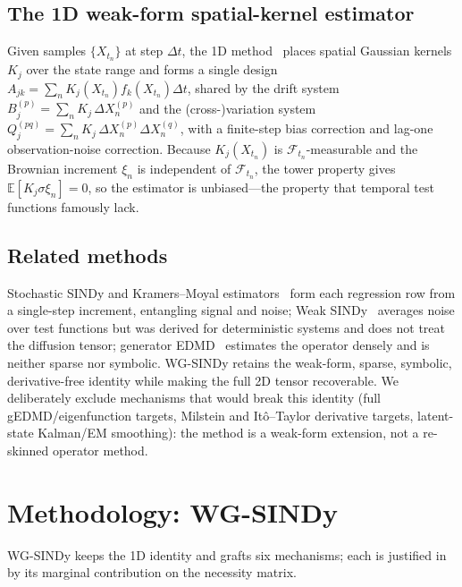 \documentclass[11pt]{article}
\newcommand{\E}{\mathbb{E}}
\newcommand{\Kj}{K_j}
\begin{document}
\subsection{The 1D weak-form spatial-kernel estimator}

Given samples $\{X_{t_n}\}$ at step $\Delta t$, the 1D method~\citep{eshwar2026weak} places
spatial Gaussian kernels $\Kj$ over the state range and forms a single design
$A_{jk}=\sum_n \Kj(X_{t_n})f_k(X_{t_n})\Delta t$, shared by the drift system
$B^{(p)}_j=\sum_n \Kj\,\Delta X_n^{(p)}$ and the (cross-)variation system
$Q^{(pq)}_j=\sum_n \Kj\,\Delta X_n^{(p)}\Delta X_n^{(q)}$, with a finite-step bias correction
and lag-one observation-noise correction. Because $\Kj(X_{t_n})$ is
$\mathcal{F}_{t_n}$-measurable and the Brownian increment $\xi_n$ is independent of
$\mathcal{F}_{t_n}$, the tower property gives $\E[\Kj\sigma\xi_n]=0$, so the estimator is
unbiased---the property that temporal test functions famously lack.

\subsection{Related methods}

Stochastic SINDy and Kramers--Moyal estimators~\citep{boninsegna2018sparse} form each
regression row from a single-step increment, entangling signal and noise; Weak
SINDy~\citep{messenger2021weak} averages noise over test functions but was derived for
deterministic systems and does not treat the diffusion tensor; generator
EDMD~\citep{klus2020gedmd} estimates the operator densely and is neither sparse nor symbolic.
WG-SINDy retains the weak-form, sparse, symbolic, derivative-free identity while making the
full 2D tensor recoverable. We deliberately exclude mechanisms that would break this identity
(full gEDMD/eigenfunction targets, Milstein and It\^o--Taylor derivative targets, latent-state
Kalman/EM smoothing): the method is a weak-form extension, not a re-skinned operator method.

\section{Methodology: WG-SINDy}\label{sec:method}

WG-SINDy keeps the 1D identity and grafts six mechanisms; each is justified in
 by its marginal contribution on the necessity matrix.
\end{document}
